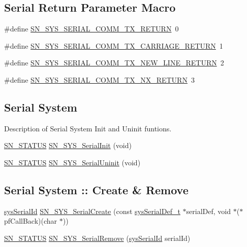 \subsection*{Serial Return Parameter Macro}
\begin{DoxyCompactItemize}
\item 
\#define \hyperlink{group__SYSTEM__SERIAL__COMM_ga51f152fbdb061eaddc04d5840b5f23dd}{S\+N\+\_\+\+S\+Y\+S\+\_\+\+S\+E\+R\+I\+A\+L\+\_\+\+C\+O\+M\+M\+\_\+\+T\+X\+\_\+\+R\+E\+T\+U\+RN}~0
\item 
\#define \hyperlink{group__SYSTEM__SERIAL__COMM_ga81ba02d50e3bf740e33accc792ec0bf8}{S\+N\+\_\+\+S\+Y\+S\+\_\+\+S\+E\+R\+I\+A\+L\+\_\+\+C\+O\+M\+M\+\_\+\+T\+X\+\_\+\+C\+A\+R\+R\+I\+A\+G\+E\+\_\+\+R\+E\+T\+U\+RN}~1
\item 
\#define \hyperlink{group__SYSTEM__SERIAL__COMM_ga96c2a829d5aa963c53ee3f5607ef22fa}{S\+N\+\_\+\+S\+Y\+S\+\_\+\+S\+E\+R\+I\+A\+L\+\_\+\+C\+O\+M\+M\+\_\+\+T\+X\+\_\+\+N\+E\+W\+\_\+\+L\+I\+N\+E\+\_\+\+R\+E\+T\+U\+RN}~2
\item 
\#define \hyperlink{group__SYSTEM__SERIAL__COMM_gafd10cc942a02102c07732e46041819bf}{S\+N\+\_\+\+S\+Y\+S\+\_\+\+S\+E\+R\+I\+A\+L\+\_\+\+C\+O\+M\+M\+\_\+\+T\+X\+\_\+\+N\+X\+\_\+\+R\+E\+T\+U\+RN}~3
\end{DoxyCompactItemize}
\subsection*{Serial System}
\label{_amgrp664b0ba7e8def11733025246348e57be}%
Description of Serial System Init and Uninit funtions. \begin{DoxyCompactItemize}
\item 
\hyperlink{group__SYSTEM__ERROR_ga4540713b9a7a18ce44d78c3a10f7442f}{S\+N\+\_\+\+S\+T\+A\+T\+US} \hyperlink{group__SYSTEM__SERIAL__COMM_ga62ac6b54ed259351b46ecdb755779e5c}{S\+N\+\_\+\+S\+Y\+S\+\_\+\+Serial\+Init} (void)
\item 
\hyperlink{group__SYSTEM__ERROR_ga4540713b9a7a18ce44d78c3a10f7442f}{S\+N\+\_\+\+S\+T\+A\+T\+US} \hyperlink{group__SYSTEM__SERIAL__COMM_ga24d03f24a38fc16ee854f0e55741cf9b}{S\+N\+\_\+\+S\+Y\+S\+\_\+\+Serial\+Uninit} (void)
\end{DoxyCompactItemize}
\subsection*{Serial System \+:\+: Create \& Remove}
\begin{DoxyCompactItemize}
\item 
\hyperlink{structsys__serial__id}{sys\+Serial\+Id} \hyperlink{group__SYSTEM__SERIAL__COMM_gaca93cc653a4c4657a762050b4228db3e}{S\+N\+\_\+\+S\+Y\+S\+\_\+\+Serial\+Create} (const \hyperlink{structsys__serial__def}{sys\+Serial\+Def\+\_\+t} $\ast$serial\+Def, void $\ast$($\ast$pf\+Call\+Back)(char $\ast$))
\item 
\hyperlink{group__SYSTEM__ERROR_ga4540713b9a7a18ce44d78c3a10f7442f}{S\+N\+\_\+\+S\+T\+A\+T\+US} \hyperlink{group__SYSTEM__SERIAL__COMM_ga8644661ec9dba59ae309766a0b29c741}{S\+N\+\_\+\+S\+Y\+S\+\_\+\+Serial\+Remove} (\hyperlink{structsys__serial__id}{sys\+Serial\+Id} serial\+Id)
\end{DoxyCompactItemize}
